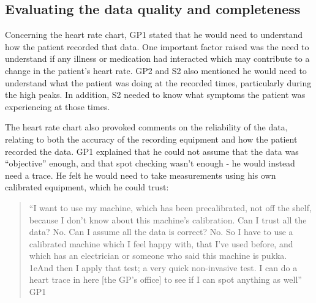 \documentclass{sigchi}
\begin{document}





\subsection{Evaluating the data quality and completeness}

Concerning the heart rate chart, GP1 stated that he would need to understand how the patient recorded that data. One important factor raised was the need to understand if any illness or medication had interacted which may contribute to a change in the patient’s heart rate. GP2 and S2 also mentioned he would need to understand what the patient was doing at the recorded times, particularly during the high peaks. In addition, S2 needed to know what symptoms the patient was experiencing at those times. 

The heart rate chart also provoked comments on the reliability of the data, relating to both the accuracy of the recording equipment and how the patient recorded the data. GP1 explained that he could not assume that the data was ``objective'' enough, and that spot checking wasn’t enough - he would instead need a trace. He felt he would need to take measurements using his own calibrated equipment, which he could trust:

\begin{quote}
    ``I want to use my machine, which has been precalibrated, not off the shelf, because I don't know about this machine's calibration. Can I trust all the data? No. Can I assume all the data is correct? No. So I have to use a calibrated machine which I feel happy with, that I've used before, and which has an electrician or someone who said this machine is pukka. 1eAnd then I apply that test; a very quick non-invasive test. I can do a heart trace in here [the GP’s office] to see if I can spot anything as well'' GP1
\end{quote}
\end{document}
